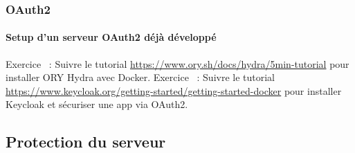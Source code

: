 \documentclass{beamer}
\begin{document}
    \begin{frame}
        \frametitle{OAuth2}
        \framesubtitle{Setup d'un serveur OAuth2 déjà développé}
        \transdissolve
        Exercice \execcounterdispinc{}~:
        Suivre le tutorial \url{https://www.ory.sh/docs/hydra/5min-tutorial} pour installer ORY Hydra avec Docker.
        \bigbreak
        Exercice \execcounterdispinc{}~:
        Suivre le tutorial \url{https://www.keycloak.org/getting-started/getting-started-docker} pour installer Keycloak et sécuriser une app via OAuth2.
    \end{frame}

    \subsection{Protection du serveur}\label{subsec:protection-serveur}
\end{document}
